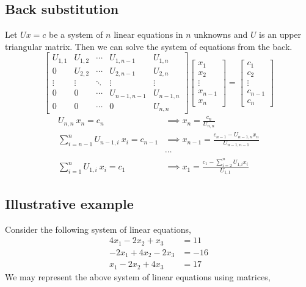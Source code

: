 \subsection{Back substitution}
	Let $Ux = c$ be a system of $n$ linear equations in $n$ unknowns and $U$ is an upper triangular matrix.
	Then we can solve the system of equations from the back.
	\[ \begin{bmatrix} U_{1,1} & U_{1,2} & \cdots & U_{1,n-1} & U_{1,n} \\ 0 & U_{2,2} & \cdots & U_{2,n-1} & U_{2,n} \\ \vdots & \vdots & \ddots & \vdots & \vdots \\ 0 & 0 & \cdots & U_{n-1,n-1} & U_{n-1,n} \\ 0 & 0 & \cdots & 0 & U_{n,n} \end{bmatrix} \begin{bmatrix} x_1 \\ x_2 \\ \vdots \\ x_{n-1} \\ x_n \end{bmatrix} = \begin{bmatrix} c_1 \\ c_2 \\ \vdots \\ c_{n-1} \\ c_n \end{bmatrix} \]
	\begin{align*}
		U_{n,n}\ x_n = c_n & \implies x_n = \frac{c_n}{U_{n,n}} \\
		\sum_{i=n-1}^{n} U_{n-1,i}\ x_i = c_{n-1}  & \implies x_{n-1} = \frac{c_{n-1} - U_{n-1,n} x_n}{U_{n-1,n-1}} \\
		& \cdots \\
		\sum_{i=1}^n U_{1,i}\ x_i  = c_1 & \implies x_1 = \frac{c_1 - \sum_{i = 2}^{n} U_{1,i} x_i}{U_{1,1}}
	\end{align*}

\subsection{Illustrative example}
	Consider the following system of linear equations,
	\begin{align*}
		4x_1  - 2x_2  + x_3 & = 11 \\
		-2x_1  + 4x_2 - 2x_3 & = -16 \\
		x_1  - 2x_2 + 4x_3 & = 17 
	\end{align*} 
	We may represent the above system of linear equations using matrices,

